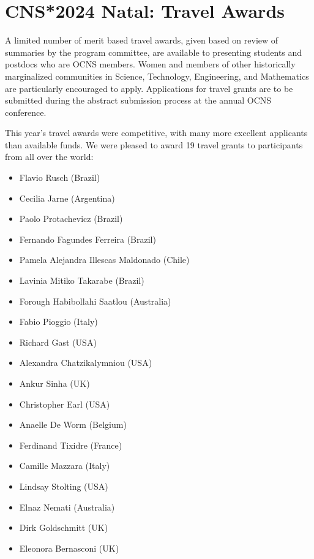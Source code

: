\section*{CNS*2024 Natal: Travel Awards}%
A limited number of merit based travel awards, given based on review of summaries by the program committee, are available to presenting students and postdocs who are OCNS members. Women and members of other historically marginalized communities in Science, Technology, Engineering, and Mathematics are particularly encouraged to apply.
Applications for travel grants are to be submitted during the abstract submission process at the annual OCNS conference.

This year's travel awards were competitive, with many more excellent applicants than available funds.
We were pleased to award 19 travel grants to participants from all over the world:

\begin{multicols}{2}
    \begin{itemize}
      \item Flavio Rusch (Brazil)
      \item Cecilia Jarne (Argentina)
      \item Paolo Protachevicz (Brazil)
      \item Fernando Fagundes Ferreira (Brazil)
      \item Pamela Alejandra Illescas Maldonado (Chile)
      \item Lavinia Mitiko Takarabe (Brazil)
      \item Forough Habibollahi Saatlou (Australia)
      \item Fabio Pioggio (Italy)
      \item Richard Gast (USA)
      \item Alexandra Chatzikalymniou (USA)
      \item Ankur Sinha (UK)
      \item Christopher Earl (USA)
      \item Anaelle De Worm (Belgium)
      \item Ferdinand Tixidre (France)
      \item Camille Mazzara (Italy)
      \item Lindsay Stolting (USA)
      \item Elnaz Nemati (Australia)
      \item Dirk Goldschmitt (UK)
      \item Eleonora Bernasconi (UK)
    \end{itemize}
\end{multicols}
